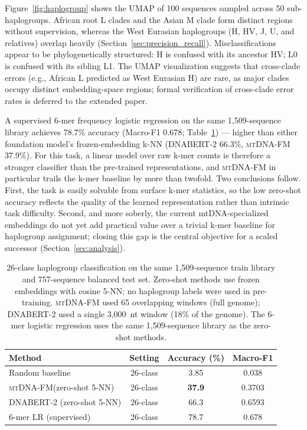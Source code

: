 \documentclass[10pt]{article}
\newcommand{\mtdnafm}{\textsc{mtDNA-FM}\xspace}
\begin{document}
Figure~\ref{fig:haplogroup} shows the UMAP of 100 sequences sampled across 50 sub-haplogroups.
African root L clades and the Asian M clade form distinct regions without supervision, whereas the
West Eurasian haplogroups (H, HV, J, U, and relatives) overlap heavily
(Section~\ref{sec:precision_recall}). Misclassifications appear to be phylogenetically structured:
H is confused with its ancestor HV; L0 is confused with its sibling L1. The UMAP visualization suggests that cross-clade errors (e.g., African L predicted as West Eurasian H)
are rare, as major clades occupy distinct embedding-space regions; formal verification of
cross-clade error rates is deferred to the extended paper.

A supervised 6-mer frequency logistic regression on the same 1,509-sequence library achieves
78.7\% accuracy (Macro-F1 0.678; Table~\ref{tab:haplogroup}) --- higher than either foundation
model's frozen-embedding k-NN (DNABERT-2 66.3\%, \mtdnafm{} 37.9\%). For this task, a linear model
over raw k-mer counts is therefore a stronger classifier than the pre-trained representations, and
\mtdnafm{} in particular trails the k-mer baseline by more than twofold. Two conclusions follow.
First, the task is easily solvable from surface k-mer statistics, so the low zero-shot accuracy
reflects the quality of the learned representation rather than intrinsic task difficulty. Second,
and more soberly, the current mtDNA-specialized embeddings do not yet add practical value over a
trivial k-mer baseline for haplogroup assignment; closing this gap is the central objective for a
scaled successor (Section~\ref{sec:analysis}).


\begin{table}[h]
\centering
\caption{26-class haplogroup classification on the same 1,509-sequence train library and
757-sequence balanced test set. Zero-shot methods use frozen embeddings with cosine 5-NN;
no haplogroup labels were used in pre-training. \mtdnafm{} used 65 overlapping windows
(full genome); DNABERT-2 used a single 3,000~nt window (18\% of the genome).
The 6-mer logistic regression uses the same 1,509-sequence library as the zero-shot methods.}
\label{tab:haplogroup}
\begin{tabular}{lccc}
\toprule
\textbf{Method} & \textbf{Setting} & \textbf{Accuracy (\%)} & \textbf{Macro-F1} \\
\midrule
Random baseline & 26-class & 3.85 & 0.038 \\
\mtdnafm (zero-shot 5-NN) & 26-class & \textbf{37.9} & 0.3703 \\
DNABERT-2 (zero-shot 5-NN) & 26-class & 66.3 & 0.6593 \\
\midrule
6-mer LR (supervised) & 26-class & 78.7 & 0.678 \\
\bottomrule
\end{tabular}
\end{table}
\end{document}
